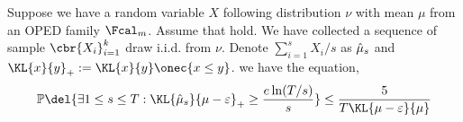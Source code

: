     \begin{lemma} \label{lemma:seq-estimator-deviation} 
        Suppose we have a random variable $X$ following distribution $\nu$ with mean $\mu$ from an OPED family $\Fcal_m$. Assume that  hold.
        We have collected a sequence of sample $\cbr{X_i}_{i=1}^k$ draw i.i.d. from $\nu$. Denote $\sum_{i=1}^s X_{i}/s$ as ${\hat\mu}_{s}$ and $\KL{x}{y}_+ := \KL{x}{y}\onec{x \leq y}$. we have the equation,
        \begin{align*}
            \mathbb{P}\del{
                \exists 1 \leq s \leq T: 
                    \KL{\hmu_s}{\mu-\varepsilon}_+ \geq \frac{e\ln(T/s)}{s}
                } 
            \leq 
            \frac{5}{T\KL{\mu-\varepsilon}{\mu} }
        \end{align*}
    \end{lemma}
